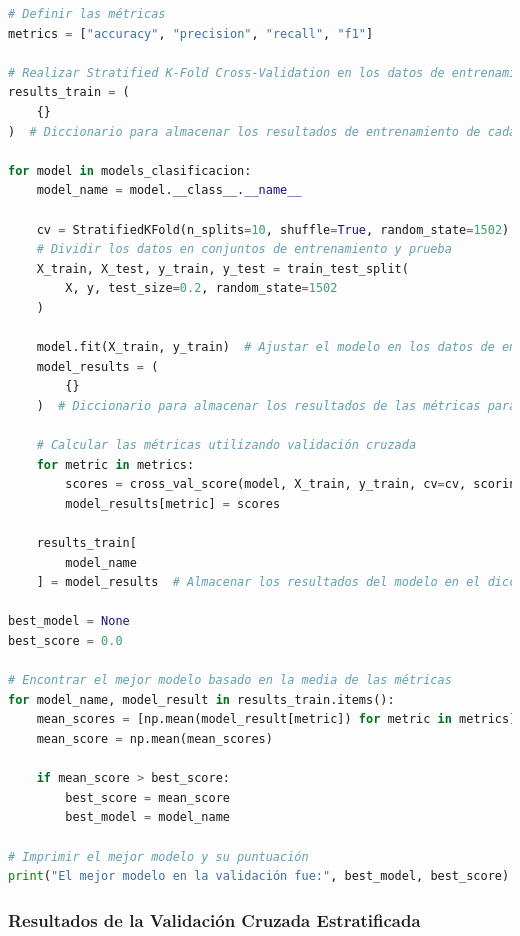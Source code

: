 \begin{lstlisting}[language=Python, caption=Aplicación de Stratified K-Fold y entrenamiento de modelos, label=lst:stratified_kfold]
# Definir las métricas
metrics = ["accuracy", "precision", "recall", "f1"]

# Realizar Stratified K-Fold Cross-Validation en los datos de entrenamiento y obtener las métricas para cada modelo
results_train = (
    {}
)  # Diccionario para almacenar los resultados de entrenamiento de cada modelo

for model in models_clasificacion:
    model_name = model.__class__.__name__

    cv = StratifiedKFold(n_splits=10, shuffle=True, random_state=1502)
    # Dividir los datos en conjuntos de entrenamiento y prueba
    X_train, X_test, y_train, y_test = train_test_split(
        X, y, test_size=0.2, random_state=1502
    )

    model.fit(X_train, y_train)  # Ajustar el modelo en los datos de entrenamiento
    model_results = (
        {}
    )  # Diccionario para almacenar los resultados de las métricas para el modelo actual

    # Calcular las métricas utilizando validación cruzada
    for metric in metrics:
        scores = cross_val_score(model, X_train, y_train, cv=cv, scoring=metric)
        model_results[metric] = scores

    results_train[
        model_name
    ] = model_results  # Almacenar los resultados del modelo en el diccionario

best_model = None
best_score = 0.0

# Encontrar el mejor modelo basado en la media de las métricas
for model_name, model_result in results_train.items():
    mean_scores = [np.mean(model_result[metric]) for metric in metrics]
    mean_score = np.mean(mean_scores)

    if mean_score > best_score:
        best_score = mean_score
        best_model = model_name

# Imprimir el mejor modelo y su puntuación
print("El mejor modelo en la validación fue:", best_model, best_score)
\end{lstlisting}


\subsubsection{Resultados de la Validación Cruzada Estratificada}

